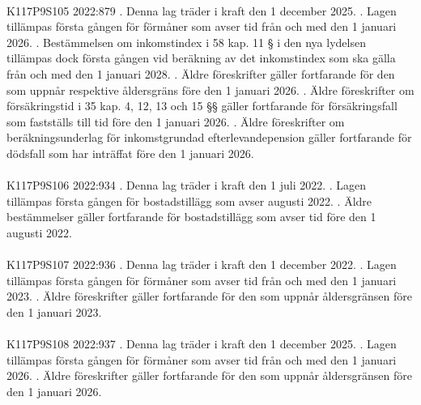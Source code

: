 \documentclass[a4paper,notitlepage,openany,10pt]{book}
\begin{document}
\paragraph*{}
{\tiny K117P9S105}
2022:879
. Denna lag träder i kraft den 1 december 2025.
. Lagen tillämpas första gången för förmåner som avser tid från och med den 1 januari 2026.
. Bestämmelsen om inkomstindex i 58 kap. 11 § i den nya lydelsen tillämpas dock första gången vid beräkning av det inkomstindex som ska gälla från och med den 1 januari 2028.
. Äldre föreskrifter gäller fortfarande för den som uppnår respektive åldersgräns före den 1 januari 2026.
. Äldre föreskrifter om försäkringstid i 35 kap. 4, 12, 13 och 15 §§ gäller fortfarande för försäkringsfall som fastställs till tid före den 1 januari 2026.
. Äldre föreskrifter om beräkningsunderlag för inkomstgrundad efterlevandepension gäller fortfarande för dödsfall som har inträffat före den 1 januari 2026.
\paragraph*{}
{\tiny K117P9S106}
2022:934
. Denna lag träder i kraft den 1 juli 2022.
. Lagen tillämpas första gången för bostadstillägg som avser augusti 2022.
. Äldre bestämmelser gäller fortfarande för bostadstillägg som avser tid före den 1 augusti 2022.
\paragraph*{}
{\tiny K117P9S107}
2022:936
. Denna lag träder i kraft den 1 december 2022.
. Lagen tillämpas första gången för förmåner som avser tid från och med den 1 januari 2023.
. Äldre föreskrifter gäller fortfarande för den som uppnår åldersgränsen före den 1 januari 2023.
\paragraph*{}
{\tiny K117P9S108}
2022:937
. Denna lag träder i kraft den 1 december 2025.
. Lagen tillämpas första gången för förmåner som avser tid från och med den 1 januari 2026.
. Äldre föreskrifter gäller fortfarande för den som uppnår åldersgränsen före den 1 januari 2026.
\end{document}
